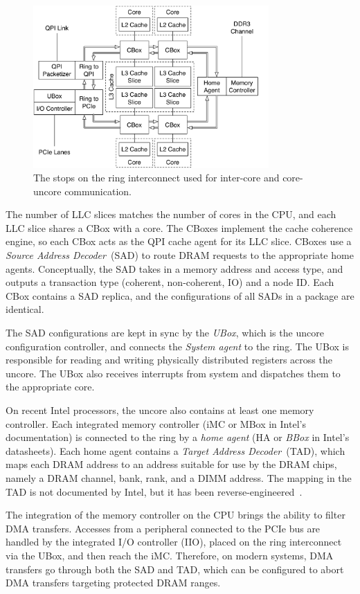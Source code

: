 \begin{figure}[hbt]
  \centering
  \includegraphics[width=90mm]{figures/cpu_uncore.pdf}
  \caption{
    The stops on the ring interconnect used for inter-core and core-uncore
    communication.
  }
  \label{fig:cpu_uncore}
\end{figure}

The number of LLC slices matches the number of cores in the CPU, and each LLC
slice shares a CBox with a core. The CBoxes implement the cache coherence
engine, so each CBox acts as the QPI cache agent for its LLC slice. CBoxes
use a \textit{Source Address Decoder}~(SAD) to route DRAM requests to the
appropriate home agents. Conceptually, the SAD takes in a memory address and
access type, and outputs a transaction type (coherent, non-coherent, IO) and a
node ID. Each CBox contains a SAD replica, and the configurations of all SADs
in a package are identical.

The SAD configurations are kept in sync by the \textit{UBox}, which is the
uncore configuration controller, and connects the \textit{System agent} to the
ring. The UBox is responsible for reading and writing physically distributed
registers across the uncore. The UBox also receives interrupts from system and
dispatches them to the appropriate core.

On recent Intel processors, the uncore also contains at least one memory
controller. Each integrated memory controller (iMC or MBox in Intel's
documentation) is connected to the ring by a \textit{home agent} (HA or
\textit{BBox} in Intel's datasheets). Each home agent contains a
\textit{Target Address Decoder}~(TAD), which maps each DRAM address to an
address suitable for use by the DRAM chips, namely a DRAM channel, bank, rank,
and a DIMM address. The mapping in the TAD is not documented by Intel, but it
has been reverse-engineered~\cite{pessil2015dramaddressing}.

The integration of the memory controller on the CPU brings the ability to
filter DMA transfers. Accesses from a peripheral connected to the PCIe bus are
handled by the integrated I/O controller (IIO), placed on the ring interconnect
via the UBox, and then reach the iMC. Therefore, on modern systems, DMA
transfers go through both the SAD and TAD, which can be configured to abort DMA
transfers targeting protected DRAM ranges.


